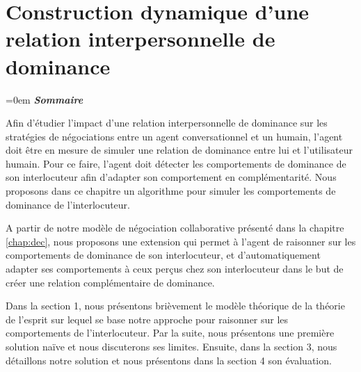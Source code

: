 \chapter{Construction dynamique d'une relation interpersonnelle de dominance}
\label{chap:Tom}
\begingroup
\parindent=0em
\emph{\textbf{Sommaire}}
\localtableofcontents 
\clearpage
\endgroup

Afin d'étudier l'impact d'une relation interpersonnelle de dominance sur les stratégies de négociations entre un agent conversationnel et un humain, l'agent doit être en mesure de simuler une relation de dominance entre lui et l'utilisateur humain. Pour ce faire, l'agent doit détecter les comportements de dominance de son interlocuteur afin d'adapter son comportement en complémentarité. Nous proposons dans ce chapitre un algorithme pour simuler les comportements de dominance de l'interlocuteur. 

A partir de notre modèle de négociation collaborative présenté dans la chapitre \ref{chap:dec}, nous proposons une extension qui permet à l'agent de raisonner sur les comportements de dominance de son interlocuteur, et d'automatiquement adapter ses comportements à ceux perçus chez son interlocuteur dans le but de créer une relation complémentaire de dominance.

Dans la section 1, nous présentons brièvement le modèle théorique de la théorie de l'esprit sur lequel se base notre approche pour raisonner sur les comportements de l'interlocuteur. Par la suite, nous présentons une première solution naïve et nous discuterons ses limites. Ensuite, dans la section 3, nous détaillons notre solution et nous présentons dans la section 4 son évaluation.  





